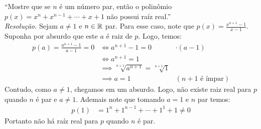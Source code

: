 \enquote{Mostre que se $n$ é um número par, então o polinômio $p(x) = x^n + x^{n - 1} + \cdots + x + 1$ não possui raíz real.} \\ 
\emph{Resolução.} Sejam $a \ne 1$ e $n \in \mathbb R$ par. Para esse caso, note que $p(x) = \frac{x^{n+1} - 1}{x - 1}$. Suponha por absurdo que este $a$ é raiz de $p$. Logo, temos:
\begin{align*}
    p(a) = \frac{a^{n+1} - 1}{a - 1} = 0 & \iff
    a^{n+1} - 1 = 0 \quad &\cdot(a - 1) \\ & \iff
    a^{n+1} = 1 \\ & \implies
    \sqrt[n+1]{a^{n+1}} = \sqrt[n+1]{1} \\ & \implies
    a = 1 \quad &(\text{$n+1$ é ímpar})
\end{align*}
Contudo, como $a \ne 1$, chegamos em um absurdo. Logo, não existe raiz real para $p$ quando $n$ é par e $a \ne 1$. Ademais note que tomando $a = 1$ e $n$ par temos:
\begin{align*}
    p(1) & = 1^{n} + 1^{n-1} + \cdots + 1^{1} + 1 \ne 0
\end{align*}
Portanto não há raíz real para $p$ quando $n$ é par.